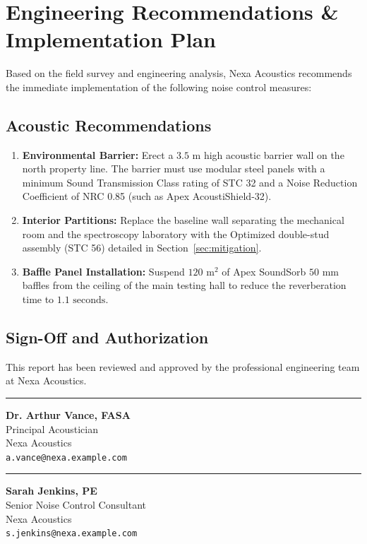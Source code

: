 \section{Engineering Recommendations \& Implementation Plan}
Based on the field survey and engineering analysis, Nexa Acoustics recommends the immediate implementation of the following noise control measures:

\subsection{Acoustic Recommendations}
\begin{enumerate}
    \item \textbf{Environmental Barrier:} Erect a $3.5\text{~m}$ high acoustic barrier wall on the north property line. The barrier must use modular steel panels with a minimum Sound Transmission Class rating of STC 32 and a Noise Reduction Coefficient of NRC 0.85 (such as Apex AcoustiShield-32).
    \item \textbf{Interior Partitions:} Replace the baseline wall separating the mechanical room and the spectroscopy laboratory with the Optimized double-stud assembly (STC 56) detailed in Section~\ref{sec:mitigation}.
    \item \textbf{Baffle Panel Installation:} Suspend $120\text{~m}^2$ of Apex SoundSorb $50\text{~mm}$ baffles from the ceiling of the main testing hall to reduce the reverberation time to $1.1\text{~seconds}$.
\end{enumerate}

\subsection{Sign-Off and Authorization}
This report has been reviewed and approved by the professional engineering team at Nexa Acoustics.

\vspace{2.5cm}

\noindent
\begin{minipage}{0.45\textwidth}
    \hrule
    \vspace{0.5em}
    \textbf{Dr. Arthur Vance, FASA} \\
    Principal Acoustician \\
    Nexa Acoustics \\
    \texttt{a.vance@nexa.example.com}
\end{minipage}
\hfill
\begin{minipage}{0.45\textwidth}
    \hrule
    \vspace{0.5em}
    \textbf{Sarah Jenkins, PE} \\
    Senior Noise Control Consultant \\
    Nexa Acoustics \\
    \texttt{s.jenkins@nexa.example.com}
\end{minipage}
